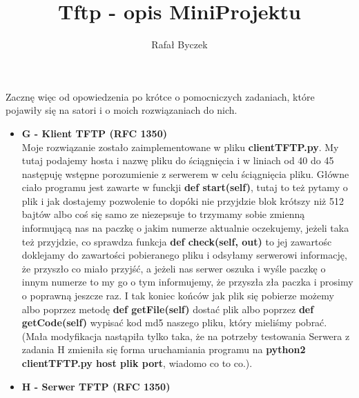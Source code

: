 \documentclass[11pt,a4paper]{article}
\author{Rafał Byczek}
\title{Tftp - opis MiniProjektu}
\begin{document}
\maketitle
Zacznę więc od opowiedzenia po krótce o pomocniczych zadaniach, które pojawiły się na satori i o moich rozwiązaniach do nich.
\begin{itemize}
\item \textbf{G - Klient TFTP (RFC 1350)}
\\
Moje rozwiązanie zostało zaimplementowane w pliku \textbf{clientTFTP.py}. My tutaj podajemy hosta i nazwę pliku  do ściągnięcia i w liniach od 40 do 45 następuję wstępne porozumienie z serwerem w celu ściągnięcia pliku. Główne ciało programu jest zawarte w funckji \textbf{def start(self)}, tutaj to też pytamy o plik i jak dostajemy pozwolenie to dopóki nie przyjdzie blok krótszy niż 512 bajtów albo coś się samo ze niezepsuje to trzymamy sobie zmienną informującą nas na paczkę o jakim numerze aktualnie oczekujemy, jeżeli taka też przyjdzie, co sprawdza funkcja \textbf{def check(self, out)} to jej zawartośc doklejamy do zawartości pobieranego pliku i odsyłamy serwerowi informację, że przyszło co miało przyjść, a jeżeli nas serwer oszuka i wyśle paczkę o innym numerze to my go o tym informujemy, że przyszła zła paczka i prosimy o poprawną jeszcze raz. I tak koniec końców jak plik się pobierze możemy albo poprzez metodę \textbf{def getFile(self)} dostać plik albo poprzez \textbf{def getCode(self)} wypisać kod md5 naszego pliku, który mieliśmy pobrać. (Mała modyfikacja nastąpiła tylko taka, że na potrzeby testowania Serwera z zadania H zmieniła się forma uruchamiania programu na \textbf{python2 clientTFTP.py host plik port}, wiadomo co to co.).
\item \textbf{H	- Serwer TFTP (RFC 1350)}
\\

\end{itemize}
\end{document}

